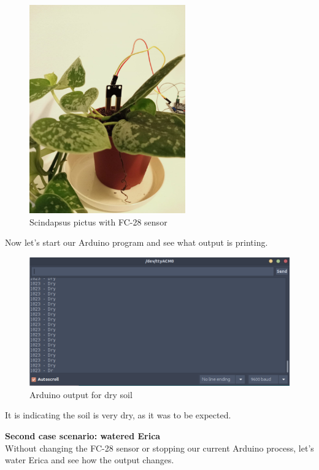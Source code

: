 \begin{figure}[H]
    \centering
    \includegraphics[width=0.6\textwidth]{fig/silvervinefc28.jpg}
    \caption{Scindapsus pictus with FC-28 sensor}
    \label{fig:ericafc28}
\end{figure}


Now let's start our Arduino program and see what output is printing.

\begin{figure}[H]
    \centering
    \includegraphics[width=1\textwidth]{fig/seco.png}
    \caption{Arduino output for dry soil}
    \label{fig:dry-soil}
\end{figure}

It is indicating the soil is very dry, as it was to be expected.

\vspace{7mm}
\textbf{Second case scenario: watered Erica} \\
Without changing the FC-28 sensor or stopping our current Arduino process, let's water Erica and see how the output changes.

